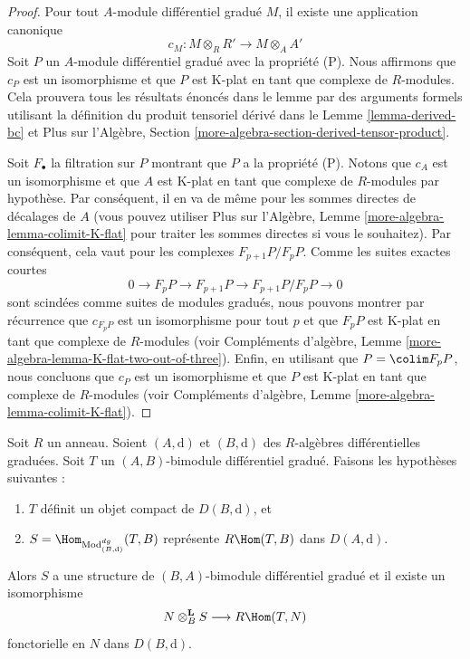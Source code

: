 \begin{proof}
Pour tout $A$-module différentiel gradué $M$, il existe une application canonique
$$
c_M : M \otimes_R R' \longrightarrow M \otimes_A A'
$$
Soit $P$ un $A$-module différentiel gradué avec la propriété (P). Nous affirmons
que $c_P$ est un isomorphisme et que $P$ est K-plat en tant que complexe de
$R$-modules. Cela prouvera tous les résultats énoncés dans le lemme par des
arguments formels utilisant la définition du produit tensoriel dérivé dans le
Lemme \ref{lemma-derived-bc} et Plus sur l'Algèbre, Section
\ref{more-algebra-section-derived-tensor-product}.

\medskip\noindent
Soit $F_\bullet$ la filtration sur $P$ montrant que $P$ a la propriété (P). Notons
que $c_A$ est un isomorphisme et que $A$ est K-plat en tant que complexe de
$R$-modules par hypothèse. Par conséquent, il en va de même pour les sommes
directes de décalages de $A$ (vous pouvez utiliser Plus sur l'Algèbre, Lemme
\ref{more-algebra-lemma-colimit-K-flat} pour traiter les sommes directes si vous
le souhaitez). Par conséquent, cela vaut pour les complexes $F_{p + 1}P/F_pP$.
Comme les suites exactes courtes
$$
0 \to F_pP \to F_{p + 1}P \to F_{p + 1}P/F_pP \to 0
$$
sont scindées comme suites de modules gradués, nous pouvons
montrer par récurrence que $c_{F_pP}$ est un isomorphisme pour tout $p$ et que
$F_pP$ est K-plat en tant que complexe de $R$-modules (voir Compléments d'algèbre,
Lemme \ref{more-algebra-lemma-K-flat-two-out-of-three}). Enfin, en utilisant que
$P = \colim F_pP$, nous concluons que $c_P$ est un isomorphisme et que $P$ est
K-plat en tant que complexe de $R$-modules (voir Compléments d'algèbre, Lemme
\ref{more-algebra-lemma-colimit-K-flat}).
\end{proof}

\begin{lemma}
\label{lemma-RHom-is-tensor}
Soit $R$ un anneau. Soient $(A, \text{d})$ et $(B, \text{d})$ des $R$-algèbres
différentielles graduées. Soit $T$ un $(A, B)$-bimodule différentiel gradué.
Faisons les hypothèses suivantes :
\begin{enumerate}
\item $T$ définit un objet compact de $D(B, \text{d})$, et
\item $S = \Hom_{\text{Mod}^{dg}_{(B, \text{d})}}(T, B)$ représente $R\Hom(T, B)$
dans $D(A, \text{d})$.
\end{enumerate}
Alors $S$ a une structure de $(B, A)$-bimodule différentiel gradué et il existe un
isomorphisme
$$
N \otimes_B^\mathbf{L} S \longrightarrow R\Hom(T, N)
$$
fonctorielle en $N$ dans $D(B, \text{d})$.
\end{lemma}

